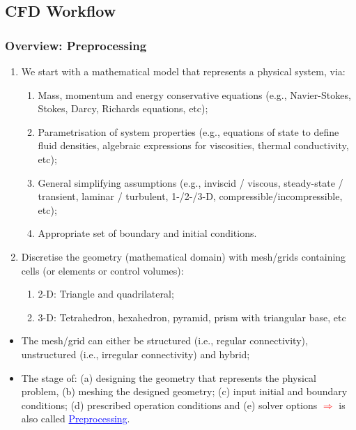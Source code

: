 \documentclass[10pt,compress]{beamer}
\begin{document}
\subsection{CFD Workflow}
 
\begin{frame}
 \frametitle{Overview: Preprocessing} 
\begin{enumerate}
  \item <1-> We start with a mathematical model that represents a physical system, via:
    \begin{enumerate}
      \item <2-> Mass, momentum and energy conservative equations (e.g., Navier-Stokes, Stokes, Darcy, Richards equations, etc);
      \item <3-> Parametrisation of system properties (e.g., equations of state to define fluid densities, algebraic expressions for viscosities, thermal conductivity, etc);
      \item <4-> General simplifying assumptions (e.g., inviscid / viscous, steady-state / transient, laminar / turbulent, 1-/2-/3-D, compressible/incompressible, etc); 
      \item <5-> Appropriate set of boundary and initial conditions.
    \end{enumerate}
  \item <6-> Discretise the geometry (mathematical domain) with mesh/grids containing cells (or elements or control volumes): 
    \begin{enumerate}
      \item <7-> 2-D: Triangle and quadrilateral;
      \item <8-> 3-D: Tetrahedron, hexahedron, pyramid, prism with triangular base, etc 
    \end{enumerate}
\end{enumerate} 
\begin{itemize}
   \item <9-> The mesh/grid can either be structured (i.e., regular connectivity), unstructured (i.e., irregular connectivity) and hybrid;
   \item <10-> The stage of: (a) designing the geometry that represents the physical problem, (b) meshing the designed geometry; (c) input initial and boundary conditions; (d) prescribed operation conditions and (e) solver options \textcolor{red}{$\Longrightarrow$} is also called \textcolor{blue}{\underline{Preprocessing}}.
\end{itemize}  

\end{frame} 
\end{document}
